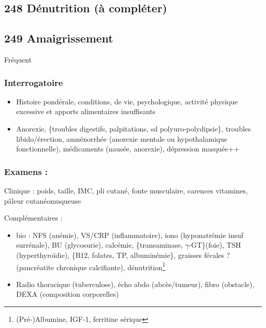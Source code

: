 \documentclass[11pt]{article}
\begin{document}
\subsection{248 \textdagger{} Dénutrition (à compléter)}
\label{sec:org612622b}
\subsection{249 \textdagger{} Amaigrissement}
\label{sec:orgc7e1fa0}
Fréquent

\subsubsection{Interrogatoire}
\label{sec:org0107177}
\begin{itemize}
\item Histoire pondérale, conditions, de vie, psychologique, activité physique excessive et apports alimentaires insuffisants
\item Anorexie, \{troubles digestifs, palpitations, sd polyuro-polydipsie\}, troubles
libido/érection, amnénorrhée (anorexie mentale ou hypothalamique
fonctionnelle), médicaments (nausée, anorexie), dépression masquée++
\end{itemize}

\subsubsection{Examens :}
\label{sec:org30cc3e0}
Clinique : poids, taille, IMC, pli cutané, fonte musculaire, carences vitamines,
pâleur cutanéomuqueuse

Complémentaires :
\begin{itemize}
\item bio : NFS (anémie), VS/CRP (inflammatoire), iono (hyponatrémie \thus insuf
surrénale), BU (glycosurie), calcémie, \{transaminase, \(\gamma\)-GT\}(foie), TSH
(hyperthyroïdie), \{B12, folates, TP, albuminémie\}, graisses fécales ?
(pancréatite chronique calcifiante), dénutrition\footnote{(Pré-)Albumine, IGF-1, ferritine sérique}
\item Radio thoracique (tuberculose), écho abdo (abcès/tumeur), fibro (obstacle),
DEXA (composition corporelles)
\end{itemize}
\end{document}

